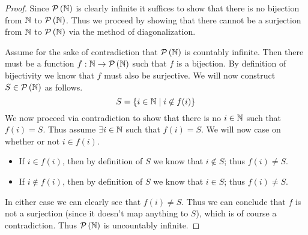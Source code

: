         \begin{proof}
            Since $\mathcal{P}\left(\mathbb{N}\right)$ is clearly infinite it suffices to show that there is
            no bijection from $\mathbb{N}$ to $\mathcal{P}\left(\mathbb{N}\right)$. Thus we proceed by showing
            that there cannot be a surjection from $\mathbb{N}$ to $\mathcal{P}\left(\mathbb{N}\right)$ via the
            method of diagonalization.

            Assume for the sake of contradiction that $\mathcal{P}\left(\mathbb{N}\right)$ is countably infinite.
            Then there must be a function $f : \mathbb{N} \rightarrow \mathcal{P}\left(\mathbb{N}\right)$ such that
            $f$ is a bijection. By definition of bijectivity we know that $f$ must also be surjective.
            We will now construct $S \in \mathcal{P}\left(\mathbb{N}\right)$ as follows.
            \[
                S = \left\{i \in \mathbb{N} \mid i \not\in f(i)\right\}
            \]
            We now proceed via contradiction to show that there is no $i \in \mathbb{N}$ such
            that $f(i) = S$.
            Thus assume $\exists i \in \mathbb{N}$ such that $f(i) = S$. We will now case on whether
            or not $i \in f(i)$.
            \begin{itemize}
                \item
                    If $i \in f(i)$, then by definition of $S$ we know that $i \not\in S$; thus $f(i) \neq S$.
                \item
                    If $i \not\in f(i)$, then by definition of $S$ we know that $i \in S$; thus $f(i) \neq S$.
            \end{itemize}
            In either case we can clearly see that $f(i) \neq S$. Thus we can conclude that
            $f$ is not a surjection (since it doesn't map anything to $S$), which is of course
            a contradiction. Thus $\mathcal{P}\left(\mathbb{N}\right)$ is uncountably infinite. \QED



\end{proof}
